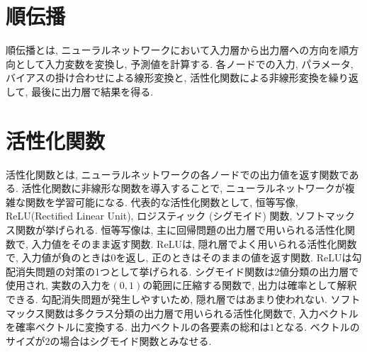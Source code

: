 \documentclass[dvipdfmx, 10pt]{jsarticle}
\begin{document}
\section*{順伝播}
順伝播とは, ニューラルネットワークにおいて入力層から出力層への方向を順方向として入力変数を変換し, 予測値を計算する. 
各ノードでの入力, パラメータ, バイアスの掛け合わせによる線形変換と, 活性化関数による非線形変換を繰り返して, 最後に出力層で結果を得る. 

\section*{活性化関数}
活性化関数とは, ニューラルネットワークの各ノードでの出力値を返す関数である. 
活性化関数に非線形な関数を導入することで, ニューラルネットワークが複雑な関数を学習可能になる. 
代表的な活性化関数として, 恒等写像, ReLU(Rectified Linear Unit), ロジスティック (シグモイド) 関数, ソフトマックス関数が挙げられる. 
恒等写像は, 主に回帰問題の出力層で用いられる活性化関数で, 入力値をそのまま返す関数. 
ReLUは, 隠れ層でよく用いられる活性化関数で, 入力値が負のときは0を返し, 正のときはそのままの値を返す関数. 
ReLUは勾配消失問題の対策の1つとして挙げられる. 
シグモイド関数は2値分類の出力層で使用され, 実数の入力を\((0, 1)\)の範囲に圧縮する関数で, 出力は確率として解釈できる. 
勾配消失問題が発生しやすいため, 隠れ層ではあまり使われない. 
ソフトマックス関数は多クラス分類の出力層で用いられる活性化関数で, 入力ベクトルを確率ベクトルに変換する. 出力ベクトルの各要素の総和は\(1\)となる. 
ベクトルのサイズが\(2\)の場合はシグモイド関数とみなせる. 
\end{document}
